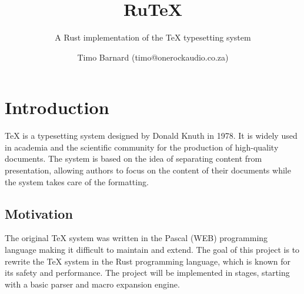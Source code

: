 \documentclass[a4paper]{scrartcl}
\title{RuTeX}
\subtitle{A Rust implementation of the \TeX{} typesetting system}
\author{Timo Barnard (timo@onerockaudio.co.za)}
\begin{document}
\maketitle
\section{Introduction}
\TeX{} is a typesetting system designed by Donald Knuth in 1978. It is widely
used in academia and the scientific community for the production of high-quality
documents. The system is based on the idea of separating content from
presentation, allowing authors to focus on the content of their documents while
the system takes care of the formatting. 

\subsection{Motivation}
The original \TeX{} system was written in the Pascal (WEB) programming language
making it difficult to maintain and extend. The goal of this project is to
rewrite the \TeX{} system in the Rust programming language, which is known for
its safety and performance. The project will be implemented in stages, starting
with a basic parser and macro expansion engine.
\end{document}
